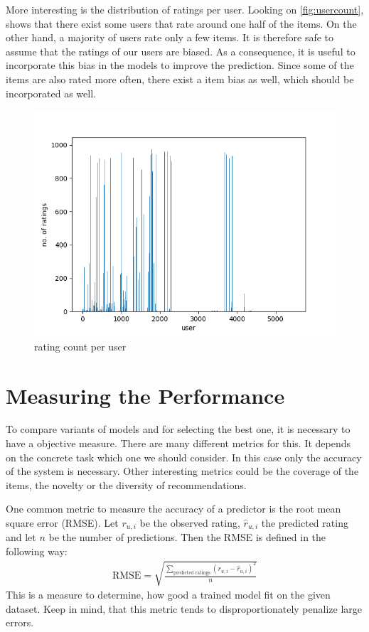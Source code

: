 \documentclass[DIV=14,twocolumn]{scrartcl}
\begin{document}
More interesting is the distribution of ratings per user. Looking on \autoref{fig:usercount}, shows that there exist some users that rate around one half of the items. On the other hand, a majority of users rate only a few items. It is therefore safe to assume that the ratings of our users are biased. As a consequence, it is useful to incorporate this bias in the models to improve the prediction.
Since some of the items are also rated more often, there exist a item bias as well, which should be incorporated as well.
\begin{figure}
	\includegraphics[width=\columnwidth]{../img/user-count}
	\caption{rating count per user}
	\label{fig:usercount}
\end{figure}

\section{Measuring the Performance}
To compare variants of models and for selecting the best one, it is necessary to have a objective measure. There are many different metrics for this. It depends on the concrete task which one we should consider. In this case only the accuracy of the system is necessary. Other interesting metrics could be the coverage of the items, the novelty or the diversity of recommendations.

One common metric to measure the accuracy of a predictor is the root mean square error (RMSE). Let $r_{u,i}$ be the observed rating, $\hat{r}_{u,i}$ the predicted rating and let $n$ be the number of predictions. Then the RMSE is defined in the following way: 
\begin{equation*}
\begin{split}
\text{RMSE} = \sqrt{\frac{\sum_{\text{predicted ratings}} (r_{u,i}-\hat{r}_{u,i})^2}{n}}
\end{split}
\end{equation*}
This is a measure to determine, how good a trained model fit on the given dataset. Keep in mind, that this metric tends to disproportionately penalize large errors. 
\end{document}
